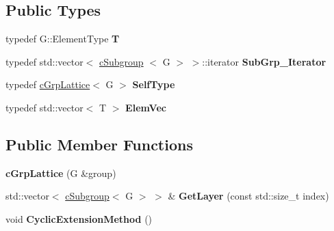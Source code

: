 \subsection*{\-Public \-Types}
\begin{DoxyCompactItemize}
\item 
\hypertarget{classcGrpLattice_adcd74a778419c1f515170d6f4eec0e46}{
typedef \-G\-::\-Element\-Type {\bfseries \-T}}
\label{classcGrpLattice_adcd74a778419c1f515170d6f4eec0e46}

\item 
\hypertarget{classcGrpLattice_a65bbb53481fb01fab29b56111e08a1a8}{
typedef std\-::vector$<$ \hyperlink{classcSubgroup}{c\-Subgroup}\*
$<$ \-G $>$ $>$\-::iterator {\bfseries \-Sub\-Grp\-\_\-\-Iterator}}
\label{classcGrpLattice_a65bbb53481fb01fab29b56111e08a1a8}

\item 
\hypertarget{classcGrpLattice_a229b8231e9d4977673fcc629c083ed27}{
typedef \hyperlink{classcGrpLattice}{c\-Grp\-Lattice}$<$ \-G $>$ {\bfseries \-Self\-Type}}
\label{classcGrpLattice_a229b8231e9d4977673fcc629c083ed27}

\item 
\hypertarget{classcGrpLattice_ae5a1bef06325a01169039dfbbfcd279a}{
typedef std\-::vector$<$ \-T $>$ {\bfseries \-Elem\-Vec}}
\label{classcGrpLattice_ae5a1bef06325a01169039dfbbfcd279a}

\end{DoxyCompactItemize}
\subsection*{\-Public \-Member \-Functions}
\begin{DoxyCompactItemize}
\item 
\hypertarget{classcGrpLattice_a27f923e1817bed7d7d3b51a02d08bf76}{
{\bfseries c\-Grp\-Lattice} (\-G \&group)}
\label{classcGrpLattice_a27f923e1817bed7d7d3b51a02d08bf76}

\item 
\hypertarget{classcGrpLattice_a37b06de9e9bf5b647c524f000b054b6a}{
std\-::vector$<$ \hyperlink{classcSubgroup}{c\-Subgroup}$<$ \-G $>$ $>$ \& {\bfseries \-Get\-Layer} (const std\-::size\-\_\-t index)}
\label{classcGrpLattice_a37b06de9e9bf5b647c524f000b054b6a}

\item 
\hypertarget{classcGrpLattice_af05dbd664f73f60ea2e9bcef893da25b}{
void {\bfseries \-Cyclic\-Extension\-Method} ()}
\label{classcGrpLattice_af05dbd664f73f60ea2e9bcef893da25b}

\end{DoxyCompactItemize}
